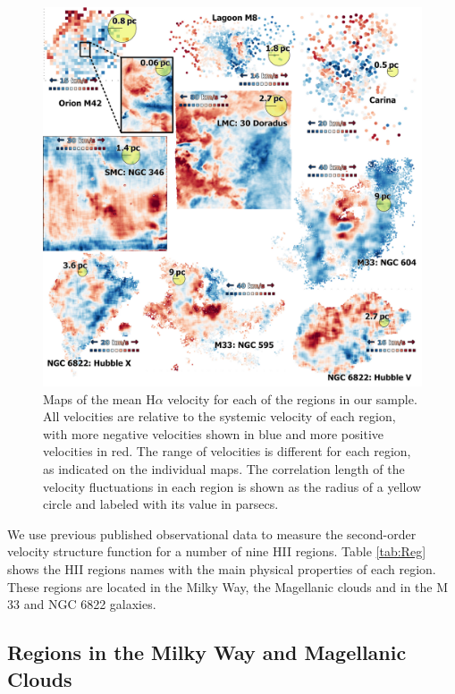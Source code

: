 \documentclass[fleqn,usenatbib, useAMS, a4paper]{mnras}
\newcommand\ha{\ensuremath{\text{H}\alpha}}
\begin{document}
\begin{figure}
  \centering
  \includegraphics[width=\linewidth]{Figures/velocity-maps-mosaic}
  \caption{
    Maps of the mean \ha{} velocity for each of the regions in our sample.
    All velocities are relative to the systemic velocity of each region,
    with more negative velocities shown in blue and more positive velocities in red.
    The range of velocities is different for each region, as indicated on the individual maps.
    The correlation length of the velocity fluctuations in each region
    is shown as the radius of a yellow circle and labeled with its value in parsecs. 
  }
  \label{fig:velocity-maps}
\end{figure}

We use previous published observational data to measure the second-order velocity structure function for a number of nine HII regions. 
Table \ref{tab:Reg} shows the HII regions names
with the main physical properties of each region. 
These regions are located in the Milky Way, the Magellanic clouds and in the M 33 and NGC 6822 galaxies.

\subsection{Regions in the Milky Way and Magellanic Clouds}
\label{sec:regions-milky-way}
\end{document}
